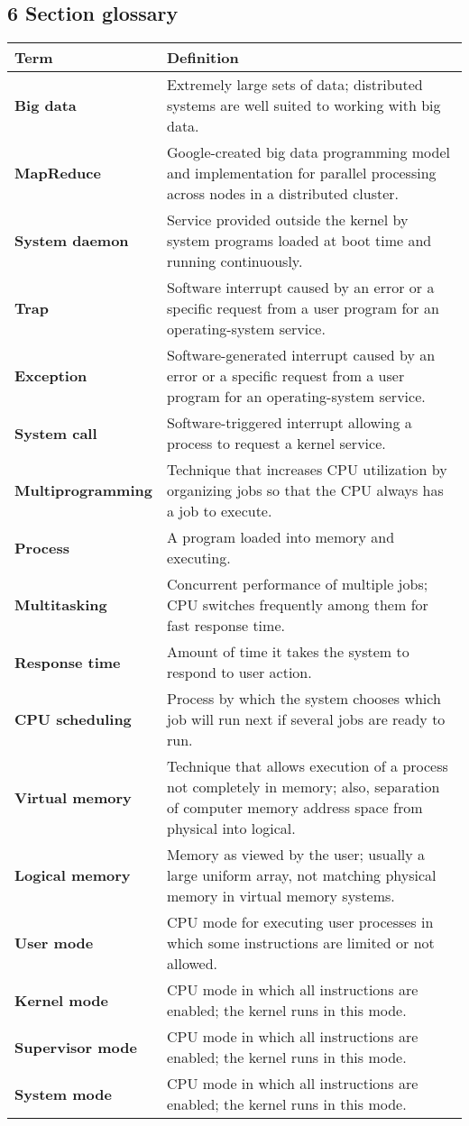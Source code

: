 \documentclass{article}
\begin{document}
\subsection*{6 Section glossary}
\centering
\begin{tabular}{>{\raggedright}p{} >{\raggedright\arraybackslash}p{}}
\toprule
\textbf{Term} & \textbf{Definition} \\
\midrule
\textbf{Big data} & Extremely large sets of data; distributed systems are well suited to working with big data. \\
\textbf{MapReduce} & Google-created big data programming model and implementation for parallel processing across nodes in a distributed cluster. \\
\textbf{System daemon} & Service provided outside the kernel by system programs loaded at boot time and running continuously. \\
\textbf{Trap} & Software interrupt caused by an error or a specific request from a user program for an operating-system service. \\
\textbf{Exception} & Software-generated interrupt caused by an error or a specific request from a user program for an operating-system service. \\
\textbf{System call} & Software-triggered interrupt allowing a process to request a kernel service. \\
\textbf{Multiprogramming} & Technique that increases CPU utilization by organizing jobs so that the CPU always has a job to execute. \\
\textbf{Process} & A program loaded into memory and executing. \\
\textbf{Multitasking} & Concurrent performance of multiple jobs; CPU switches frequently among them for fast response time. \\
\textbf{Response time} & Amount of time it takes the system to respond to user action. \\
\textbf{CPU scheduling} & Process by which the system chooses which job will run next if several jobs are ready to run. \\
\textbf{Virtual memory} & Technique that allows execution of a process not completely in memory; also, separation of computer memory address space from physical into logical. \\
\textbf{Logical memory} & Memory as viewed by the user; usually a large uniform array, not matching physical memory in virtual memory systems. \\
\textbf{User mode} & CPU mode for executing user processes in which some instructions are limited or not allowed. \\
\textbf{Kernel mode} & CPU mode in which all instructions are enabled; the kernel runs in this mode. \\
\textbf{Supervisor mode} & CPU mode in which all instructions are enabled; the kernel runs in this mode. \\
\textbf{System mode} & CPU mode in which all instructions are enabled; the kernel runs in this mode. \\
\bottomrule
\end{tabular}
\end{document}
